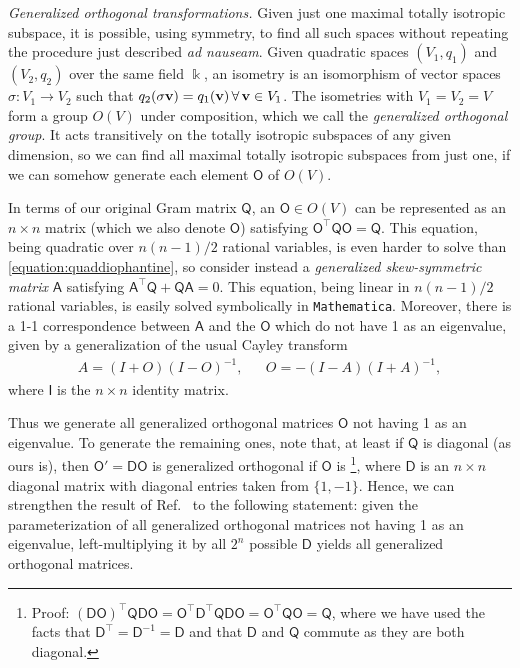 \documentclass[11pt,a4paper]{article}
\begin{document}
{\em Generalized orthogonal transformations.}
Given just one maximal totally isotropic subspace, it is possible, using symmetry, to find all such spaces without repeating the procedure just described {\em ad nauseam}. Given quadratic spaces $(V_1,q_1)$ and $(V_2,q_2)$ over the same field $\Bbbk$, an isometry is an isomorphism of vector spaces $\sigma:V_1\to V_2$ such that $q_2(\sigma\vb{v})=q_1(\vb{v})\,\forall\,\vb{v}\in V_1$.
The isometries with $V_1 = V_2 = V$ form a group $O(V)$ under composition, which we call the \emph{generalized orthogonal group}. It acts transitively on the totally isotropic subspaces of any given dimension, so we can find all maximal totally isotropic subspaces from just  one, if we can somehow generate each element $\mathsf{O}$ of $O(V)$. 

In terms of our original Gram matrix $\mathsf{Q}$, an $\mathsf{O} \in O(V)$ can be represented as an $n\times n$ matrix (which we also denote $\mathsf{O}$) satisfying $\mathsf{O}^\intercal\mathsf{Q}\mathsf{O}=\mathsf{Q}$. This equation, being quadratic over $n(n-1)/2$ rational variables, is even harder to solve than \cref{equation:quaddiophantine}, so consider instead 
a \emph{generalized skew-symmetric matrix} $\mathsf{A}$ satisfying ${\mathsf{A}^\intercal\mathsf{Q}+ \mathsf{Q}\mathsf{A} = 0}$. This equation, being linear in $n(n-1)/2$ rational variables, is easily solved symbolically in \texttt{Mathematica}. Moreover, there is a 1-1 correspondence between $\mathsf{A}$ and the $\mathsf{O}$ which do not have 1 as an eigenvalue, given by a generalization of the usual Cayley transform~\cite{GantmakherF.R.FeliksRuvimovich2000Ttom}
\sansmath
\begin{align*}
	A=(I+O)(I-O)^{-1},&&O=-(I-A)(I+A)^{-1},
\end{align*}
\unsansmath
where $\mathsf{I}$ is the $n\times n$ identity matrix.

Thus we generate all generalized orthogonal matrices $\mathsf{O}$ not having 1 as an eigenvalue. To generate the remaining ones, note that, at least if $\mathsf{Q}$ is diagonal (as ours is), then $\mathsf{O'=DO}$ is generalized orthogonal if $\mathsf{O}$ is \footnote{Proof: $\mathsf{(DO)^\intercal QDO = O^\intercal D^\intercal QDO = O^\intercal QO = Q}$, where we have used the facts that $\mathsf{D}^\intercal=\mathsf{D}^{-1}=\mathsf{D}$ and that $\mathsf{D}$ and $\mathsf{Q}$ commute as they are both diagonal.}, where $\mathsf{D}$ is an $n\times n$ diagonal matrix with diagonal entries taken from $\{1,-1\}$.
Hence, we can strengthen the result of Ref.~\cite{27f6df08-b306-396c-b148-e0befbe5274c} to the following statement: given the parameterization of all generalized orthogonal matrices not having 1 as an eigenvalue, left-multiplying it by all $2^n$ possible $\mathsf{D}$ yields all generalized orthogonal matrices.
\end{document}

